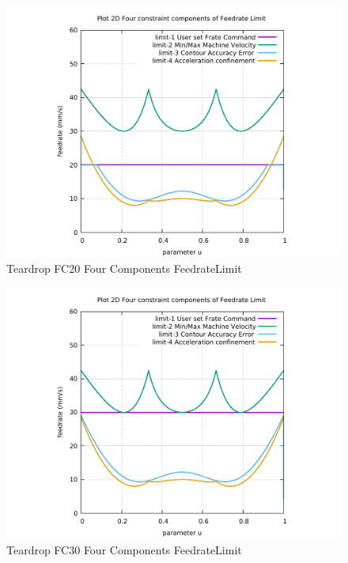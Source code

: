 \begin{figure}
	\caption     {Teardrop FC20 Four Components FeedrateLimit}
	\label{32-img-Teardrop-FC20-Four-Components-FeedrateLimit.pdf}
	\includegraphics[width=1.00\textwidth]{Chap4/appendix/app-Teardrop/plots/32-img-Teardrop-FC20-Four-Components-FeedrateLimit.pdf}
\end{figure}


\clearpage
\pagebreak

\begin{figure}
	\caption     {Teardrop FC30 Four Components FeedrateLimit}
	\label{33-img-Teardrop-FC30-Four-Components-FeedrateLimit.pdf}
	\includegraphics[width=1.00\textwidth]{Chap4/appendix/app-Teardrop/plots/33-img-Teardrop-FC30-Four-Components-FeedrateLimit.pdf}
\end{figure}


